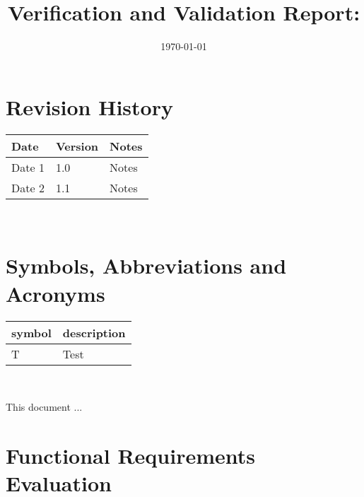 \documentclass[12pt, titlepage]{article}
\begin{document}
\title{Verification and Validation Report: \progname} 
\author{\authname}
\date{\today}
	
\maketitle


\section{Revision History}

\begin{tabularx}{\textwidth}{p{3cm}p{2cm}X}
\toprule {\bf Date} & {\bf Version} & {\bf Notes}\\
\midrule
Date 1 & 1.0 & Notes\\
Date 2 & 1.1 & Notes\\
\bottomrule
\end{tabularx}

~\newpage

\section{Symbols, Abbreviations and Acronyms}

\renewcommand{\arraystretch}{1.2}
\begin{tabular}{l l} 
  \toprule		
  \textbf{symbol} & \textbf{description}\\
  \midrule 
  T & Test\\
  \bottomrule
\end{tabular}\\


\newpage

\tableofcontents

\listoftables %

\listoffigures %

\newpage


This document ...

\section{Functional Requirements Evaluation}
\end{document}
